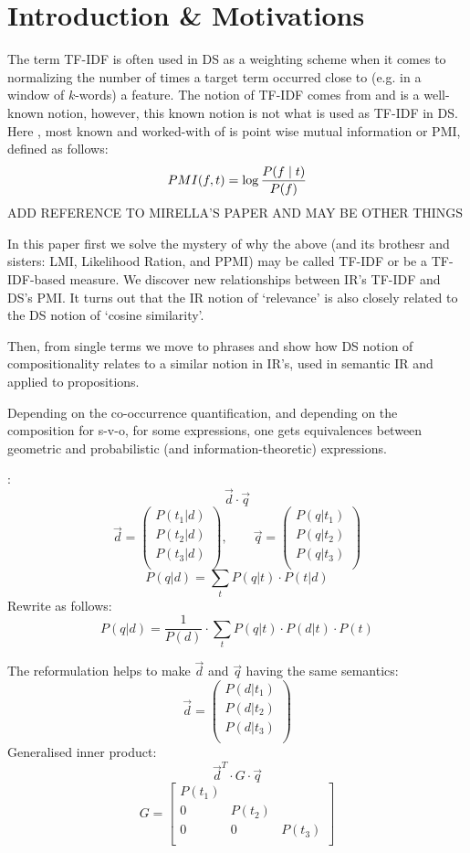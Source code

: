 \section{Introduction \& Motivations}


The term TF-IDF is often used in DS as a weighting scheme when it comes to normalizing  the number of times a target term occurred close to (e.g. in a window of $k$-words) a feature. The notion of TF-IDF comes from and is a well-known notion, however, this known notion is not what is used as TF-IDF in DS. Here ,  most known and worked-with of  is point wise mutual information or  PMI, defined as follows:
\[
 PMI (f, t) =  \log{{P(f \mid t)} \over{P(f)}}
 \]
ADD REFERENCE TO MIRELLA'S PAPER AND MAY BE OTHER THINGS

In this paper first we solve the mystery of why  the above (and its brothesr and sisters: LMI, Likelihood Ration, and PPMI) may be called TF-IDF or be a TF-IDF-based measure. We discover new relationships between IR's TF-IDF and DS's PMI. It turns out that the IR notion of `relevance'  is also closely related to the DS notion of `cosine similarity'. 

Then, from single terms we move to phrases and show how DS notion of  compositionality relates to a similar notion in  IR's, used in semantic IR and applied to propositions. 


\hrulefill

Depending on the co-occurrence quantification, and depending on the composition for s-v-o, for some expressions, one  gets equivalences between geometric and probabilistic (and information-theoretic) expressions.


\cite{Wong/Yao:95}:
\[
\vec{d} \cdot \vec{q}
\]
\[
\vec{d} =
	\left(
	\begin{matrix}
	P(t_1|d)\\
	P(t_2|d)\\
	P(t_3|d)\\
	\end{matrix}
	\right),
\qquad
\vec{q} =
	\left(
	\begin{matrix}
	P(q|t_1)\\
	P(q|t_2)\\
	P(q|t_3)\\
	\end{matrix}
	\right)
\]
\[
P(q|d) = \sum_t P(q|t) \cdot P(t|d)
\]
Rewrite as follows:
\[
P(q|d) = \frac{1}{P(d)} \cdot \sum_t P(q|t) \cdot P(d|t) \cdot P(t)
\]

The reformulation helps
to make $\vec{d}$ and $\vec{q}$ having the same semantics:
\[
\vec{d} =
	\left(
	\begin{matrix}
	P(d|t_1)\\
	P(d|t_2)\\
	P(d|t_3)\\
	\end{matrix}
	\right)
\]
Generalised inner product:
\[
\vec{d}^T \cdot G \cdot \vec{q}
\]
\[
G=
\left[
\begin{matrix}
P(t_1) \\
0 & P(t_2) \\
0 & 0 & P(t_3) \\
\end{matrix}
\right]
\]


